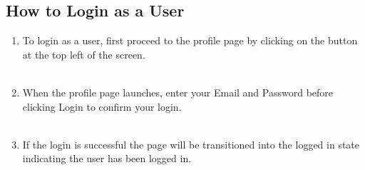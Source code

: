 \documentclass[12pt,a4paper]{article}
\begin{document}
			\subsection{How to Login as a User}
				\begin{enumerate}
					\item To login as a user, first proceed to the profile page by clicking on the button at 
						the top left of the screen.\\\\
					\item When the profile page launches, enter your Email and Password before clicking Login 
						to confirm your login.\\\\
						\newpage
					\item If the login is successful the page will be transitioned into the logged in state 
						indicating the user has been logged in.\\\\
				\end{enumerate}
\end{document}
